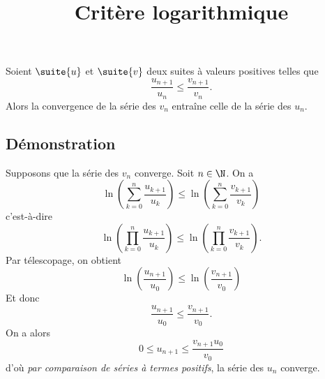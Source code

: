 \documentclass[fontsize=12pt,twoside=false,parskip=half, french]{scrartcl}
\title{Critère logarithmique}
\date{}
\author{}
\begin{document}
\maketitle
   \begin{Theoreme}
      Soient $\suite{u}$ et $\suite{v}$ deux suites à valeurs positives telles que 
      \[
         \frac{u_{n + 1}}{u_n} \leq \frac{v_{n + 1}}{v_n}.
      \]
      Alors la convergence de la série des $v_n$ entraîne celle de la série des $u_n$.
   \end{Theoreme}
   \subsection{Démonstration}
      Supposons que la série des $v_n$ converge. Soit $n \in \N$. On a
      \[
         \ln \left( \sum_{k = 0}^n \frac{u_{k + 1}}{u_k} \right) \leq \ln \left( \sum_{k = 0}^n \frac{v_{k + 1}}{v_k} \right)
      \]
      c’est-à-dire
      \[
        \ln \left(\prod_{k = 0}^n \frac{u_{k + 1}}{u_k} \right) \leq \ln \left(\prod_{k = 0}^n\frac{v_{k + 1}}{v_k} \right).
      \]
      Par télescopage, on obtient
      \[
         \ln \left(\frac{u_{n + 1}}{u_0}\right) \leq \ln\left(\frac{v_{n + 1}}{v_0}\right)
      \]
      Et donc 
      \[
         \frac{u_{n + 1}}{u_0} \leq \frac{v_{n + 1}}{v_0}.
      \]
      On a alors
      \[
         0 \leq u_{n + 1} \leq \frac{v_{n + 1} u_0}{v_0}
      \]
      d’où \emph{par comparaison de séries à termes positifs}, la série des $u_n$ converge.
\end{document}
